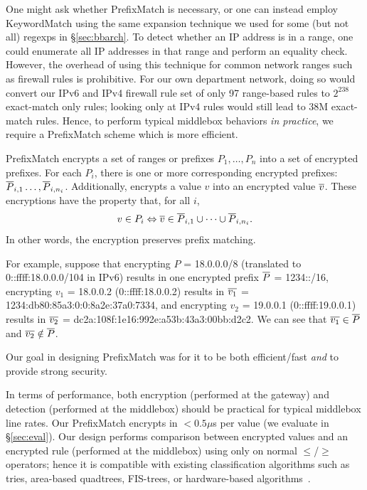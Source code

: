 One might ask whether PrefixMatch is necessary, or one can instead employ KeywordMatch using the same expansion technique we used for some (but not all) regexps in \S\ref{sec:bbarch}. 
To detect whether an IP address is in a range, one could enumerate all IP addresses in that range and perform an equality check. However, the overhead of using this technique for common network ranges such as firewall rules is prohibitive.
For our own department network, doing so would convert our IPv6 and IPv4 firewall rule set of only 97 range-based rules to $2^{238}$ exact-match only rules; looking only at IPv4 rules would still lead to 38M exact-match rules.
Hence, to perform typical middlebox behaviors {\it in practice}, we require a PrefixMatch scheme which is more efficient.




PrefixMatch encrypts a set of ranges or prefixes $P_1, \dots, P_n$ into a set of encrypted prefixes. For each $P_i$, there is one or more corresponding encrypted prefixes: $\overline{P}_{i,1} \dots, \overline{P}_{i, n_i}$.  Additionally, \pmatch{} encrypts a value $v$ into an encrypted value $\overline{v}$. These encryptions have the  property that, for all $i$,  
%
\[  v \in P_i  \Leftrightarrow \overline{v} \in \overline{P}_{i, 1} \cup \dots \cup \overline{P}_{i, n_i}. \]
%
In other words, the encryption preserves prefix matching.

For example, suppose that encrypting $P$ = 18.0.0.0/8 (translated to 0::ffff:18.0.0.0/104 in IPv6) results in one encrypted prefix $\overline{P}$ = 1234::/16, encrypting $v_1$ = 18.0.0.2 (0::ffff:18.0.0.2) results in  
 $\overline{v_1}$ = 1234:db80:85a3:0:0:8a2e:37a0:7334, and encrypting $v_2$ = 19.0.0.1 (0::ffff:19.0.0.1) results in 
$\overline{v_2}$ = dc2a:108f:1e16:992e:a53b:43a3:00bb:d2c2. We can see that $\overline{v_1} \in \overline{P}$ and $\overline{v_2} \notin \overline{P}$. 

Our goal in designing PrefixMatch was for it to be both efficient/fast {\em and} to provide strong security.



In terms of performance, both encryption (performed at the gateway) and detection (performed at the middlebox) should be practical for typical middlebox line rates.
Our PrefixMatch encrypts in $< 0.5\mu$s per value (we evaluate in \S\ref{sec:eval}).
Our design performs comparison between encrypted values and an encrypted rule (performed at the middlebox) using only on normal $\leq$/$\geq$ operators; hence it is compatible with existing classification algorithms such as tries, area-based quadtrees, FIS-trees, or hardware-based algorithms~\cite{packet_classif}.

